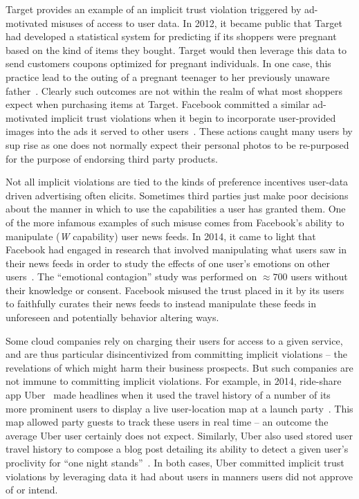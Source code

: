 Target provides an example of an implicit trust violation triggered by
ad-motivated misuses of access to user data. In 2012, it became public
that Target had developed a statistical system for predicting if its
shoppers were pregnant based on the kind of items they bought. Target
would then leverage this data to send customers coupons optimized for
pregnant individuals. In one case, this practice lead to the outing of
a pregnant teenager to her previously unaware
father~\cite{hill2012}. Clearly such outcomes are not within the realm
of what most shoppers expect when purchasing items at Target. Facebook
committed a similar ad-motivated implicit trust violations when it
begin to incorporate user-provided images into the ads it served to
other users~\cite{mashable-socialads}. These actions caught many users
by sup rise as one does not normally expect their personal photos to
be re-purposed for the purpose of endorsing third party products.

Not all implicit violations are tied to the kinds of preference
incentives user-data driven advertising often elicits. Sometimes third
parties just make poor decisions about the manner in which to use the
capabilities a user has granted them. One of the more infamous
examples of such misuse comes from Facebook's ability to manipulate
(\emph{W} capability) user news feeds. In 2014, it came to light that
Facebook had engaged in research that involved manipulating what users
saw in their news feeds in order to study the effects of one user's
emotions on other users~\cite{goel2014}. The ``emotional contagion''
study was performed on $\approx700$ users without their knowledge or
consent. Facebook misused the trust placed in it by its users to
faithfully curates their news feeds to instead manipulate these feeds
in unforeseen and potentially behavior altering ways.

Some cloud companies rely on charging their users for access to a
given service, and are thus particular disincentivized from committing
implicit violations -- the revelations of which might harm their
business prospects. But such companies are not immune to committing
implicit violations. For example, in 2014, ride-share app
Uber~\cite{uber} made headlines when it used the travel history of a
number of its more prominent users to display a live user-location map
at a launch party~\cite{sims2014}. This map allowed party guests to
track these users in real time -- an outcome the average Uber user
certainly does not expect. Similarly, Uber also used stored user
travel history to compose a blog post detailing its ability to detect
a given user's proclivity for ``one night
stands''~\cite{pagliery2014}. In both cases, Uber committed implicit
trust violations by leveraging data it had about users in manners
users did not approve of or intend.

